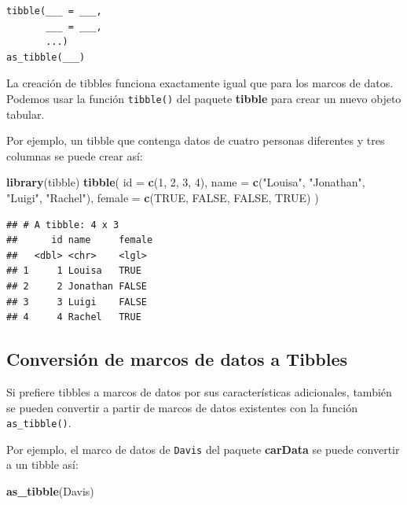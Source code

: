 \documentclass[
]{book}
\newenvironment{Shaded}{\begin{snugshade}}{\end{snugshade}}
\newcommand{\DataTypeTok}[1]{\textcolor[rgb]{0.13,0.29,0.53}{#1}}
\newcommand{\DecValTok}[1]{\textcolor[rgb]{0.00,0.00,0.81}{#1}}
\newcommand{\KeywordTok}[1]{\textcolor[rgb]{0.13,0.29,0.53}{\textbf{#1}}}
\newcommand{\NormalTok}[1]{#1}
\newcommand{\OtherTok}[1]{\textcolor[rgb]{0.56,0.35,0.01}{#1}}
\newcommand{\StringTok}[1]{\textcolor[rgb]{0.31,0.60,0.02}{#1}}
\begin{document}
\begin{verbatim}
tibble(___ = ___, 
       ___ = ___, 
       ...)
as_tibble(___)
\end{verbatim}

La creación de tibbles funciona exactamente igual que para los marcos de datos. Podemos usar la función \texttt{tibble()} del paquete \textbf{tibble} para crear un nuevo objeto tabular.

Por ejemplo, un tibble que contenga datos de cuatro personas diferentes y tres columnas se puede crear así:

\begin{Shaded}
\begin{Highlighting}[]
\KeywordTok{library}\NormalTok{(tibble)}
\KeywordTok{tibble}\NormalTok{(}
  \DataTypeTok{id =} \KeywordTok{c}\NormalTok{(}\DecValTok{1}\NormalTok{, }\DecValTok{2}\NormalTok{, }\DecValTok{3}\NormalTok{, }\DecValTok{4}\NormalTok{),}
  \DataTypeTok{name =} \KeywordTok{c}\NormalTok{(}\StringTok{"Louisa"}\NormalTok{, }\StringTok{"Jonathan"}\NormalTok{, }\StringTok{"Luigi"}\NormalTok{, }\StringTok{"Rachel"}\NormalTok{),}
  \DataTypeTok{female =} \KeywordTok{c}\NormalTok{(}\OtherTok{TRUE}\NormalTok{, }\OtherTok{FALSE}\NormalTok{, }\OtherTok{FALSE}\NormalTok{, }\OtherTok{TRUE}\NormalTok{)}
\NormalTok{)}
\end{Highlighting}
\end{Shaded}

\begin{verbatim}
## # A tibble: 4 x 3
##      id name     female
##   <dbl> <chr>    <lgl> 
## 1     1 Louisa   TRUE  
## 2     2 Jonathan FALSE 
## 3     3 Luigi    FALSE 
## 4     4 Rachel   TRUE
\end{verbatim}

\hypertarget{conversiuxf3n-de-marcos-de-datos-a-tibbles}{%
\subsection{Conversión de marcos de datos a Tibbles}\label{conversiuxf3n-de-marcos-de-datos-a-tibbles}}

Si prefiere tibbles a marcos de datos por sus características adicionales, también se pueden convertir a partir de marcos de datos existentes con la función \texttt{as\_tibble()}.

Por ejemplo, el marco de datos de \texttt{Davis} del paquete \textbf{carData} se puede convertir a un tibble así:

\begin{Shaded}
\begin{Highlighting}[]
\KeywordTok{as_tibble}\NormalTok{(Davis)}
\end{Highlighting}
\end{Shaded}
\end{document}
